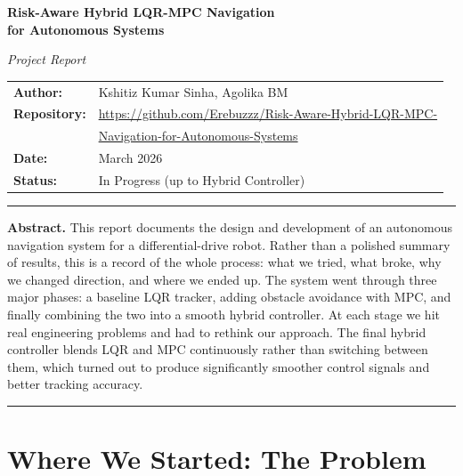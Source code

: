 \documentclass[12pt,a4paper]{article}
\begin{document}
\begin{titlepage}
\centering
\vspace*{3cm}
{\LARGE\bfseries Risk-Aware Hybrid LQR-MPC Navigation\\[0.4em]
for Autonomous Systems\par}
\vspace{0.6cm}
{\large\itshape Project Report\par}
\vspace{2cm}
\begin{tabular}{ll}
  \textbf{Author:}      & Kshitiz Kumar Sinha, Agolika BM \\[4pt]
  \textbf{Repository:}  & \small\url{https://github.com/Erebuzzz/Risk-Aware-Hybrid-LQR-MPC-}\\
                        & \small\url{Navigation-for-Autonomous-Systems} \\[4pt]
  \textbf{Date:}        & March 2026 \\[4pt]
  \textbf{Status:}      & In Progress (up to Hybrid Controller)
\end{tabular}
\vspace{2cm}

\noindent\rule{0.85\linewidth}{0.5pt}
\vspace{0.4cm}

\begin{minipage}{0.85\linewidth}
\textbf{Abstract.}
This report documents the design and development of an autonomous navigation
system for a differential-drive robot. Rather than a polished summary of
results, this is a record of the whole process: what we tried, what broke,
why we changed direction, and where we ended up. The system went through
three major phases: a baseline LQR tracker, adding obstacle avoidance
with MPC, and finally combining the two into a smooth hybrid controller.
At each stage we hit real engineering problems and had to rethink our
approach. The final hybrid controller blends LQR and MPC continuously
rather than switching between them, which turned out to produce significantly
smoother control signals and better tracking accuracy.
\end{minipage}

\noindent\rule{0.85\linewidth}{0.5pt}
\end{titlepage}

\tableofcontents
\clearpage

\section{Where We Started: The Problem}
\end{document}
